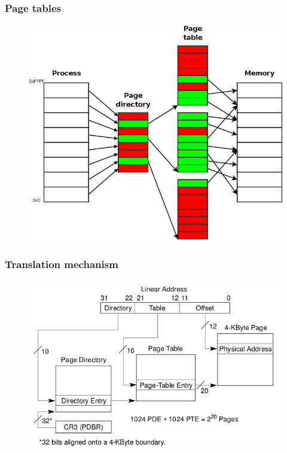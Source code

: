 \documentclass{beamer}
\begin{document}
\begin{frame}
  \frametitle{Page tables}

  \begin{figure}
  \includegraphics[scale=0.25]{pagetable.png}
  \end{figure}
\end{frame}

\begin{frame}
  \frametitle{Translation mechanism}

  \begin{figure}
  \includegraphics[scale=0.5]{virt.png}
  \end{figure}
\end{frame}
\end{document}
